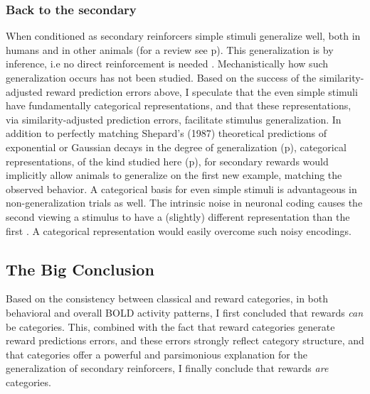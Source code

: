 \documentclass[doc,12pt]{apa}        %
\begin{document}
\subsubsection{Back to the secondary}
\label{sub:generalsense}
When conditioned as secondary reinforcers simple stimuli generalize well, both in humans and in other animals (for a review see p\pageref{subsub:birds}).  This generalization is by inference, i.e no direct reinforcement is needed \cite{Guttman:1956p8355,Nakamura:2006p9093,Smith:2011p9101}.  Mechanistically how such generalization occurs has not been studied.  Based on the success of the similarity-adjusted reward prediction errors above, I speculate that the even simple stimuli have fundamentally categorical representations, and that these representations, via similarity-adjusted prediction errors, facilitate stimulus generalization.  In addition to perfectly matching Shepard's (1987) theoretical predictions of exponential or Gaussian decays in the degree of generalization (p\pageref{subsub:curves}), categorical representations, of the kind studied here (p\pageref{subsub:catquant}), for secondary rewards would implicitly allow animals to generalize on the first new example, matching the observed behavior.  A categorical basis for even simple stimuli is advantageous in non-generalization trials as well. The intrinsic noise in neuronal coding causes the second viewing a stimulus to have a (slightly) different representation than the first \cite{Ashby:1986p9783}.  A categorical representation would easily overcome such noisy encodings. 

\subsection{The Big Conclusion}
Based on the consistency between classical and reward categories, in both behavioral and overall BOLD activity patterns, I first concluded that rewards \emph{can} be categories.  This, combined with the fact that reward categories generate reward predictions errors, and these errors strongly reflect category structure, and that categories offer a powerful and parsimonious explanation for the generalization of secondary reinforcers, I finally conclude that rewards \emph{are} categories.
\end{document}

